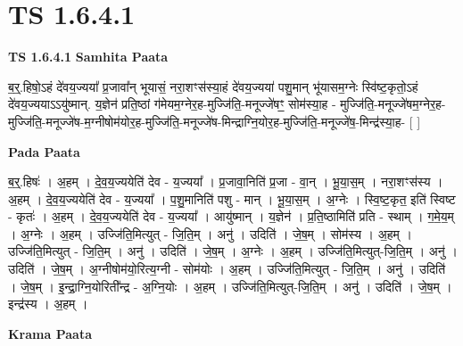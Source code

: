 \documentclass[17pt]{extarticle}
\begin{document}
\section*{ TS 1.6.4.1 }

\textbf{TS 1.6.4.1 } \newline
\textbf{Samhita Paata} \newline

ब॒र्॒.हिषो॒ऽहं दे॑वय॒ज्यया᳚ प्र॒जावा᳚न् भूयासं॒ नरा॒शꣳस॑स्या॒हं दे॑वय॒ज्यया॑ पशु॒मान् भू॑यासम॒ग्नेः स्वि॑ष्ट॒कृतो॒ऽहं दे॑वय॒ज्ययाऽऽयु॑ष्मान्. य॒ज्ञेन॑ प्रति॒ष्ठां ग॑मेयम॒ग्नेर॒ह-मुज्जि॑ति॒-मनूज्जे॑षꣳ॒॒ सोम॑स्या॒ह - मुज्जि॑ति॒-मनूज्जे॑षम॒ग्नेर॒ह-मुज्जि॑ति॒-मनूज्जे॑ष-म॒ग्नीषोम॑योर॒ह-मुज्जि॑ति॒-मनूज्जे॑ष-मिन्द्राग्नि॒योर॒ह-मुज्जि॑ति॒-मनूज्जे॑ष॒-मिन्द्र॑स्या॒ह- [ ] \newline

\textbf{Pada Paata} \newline

ब॒र्॒.हिषः॑ । अ॒हम् । दे॒व॒य॒ज्ययेति॑ देव - य॒ज्यया᳚ । प्र॒जावा॒निति॑ प्र॒जा - वा॒न् । भू॒या॒स॒म् । नरा॒शꣳस॑स्य । अ॒हम् । दे॒व॒य॒ज्ययेति॑ देव - य॒ज्यया᳚ । प॒शु॒मानिति॑ पशु - मान् । भू॒या॒स॒म् । अ॒ग्नेः । स्वि॒ष्ट॒कृत॒ इति॑ स्विष्ट - कृतः॑ । अ॒हम् । दे॒व॒य॒ज्ययेति॑ देव - य॒ज्यया᳚ । आयु॑ष्मान् । य॒ज्ञेन॑ । प्र॒ति॒ष्ठामिति॑ प्रति - स्थाम् । ग॒मे॒य॒म् । अ॒ग्नेः । अ॒हम् । उज्जि॑ति॒मित्युत् - जि॒ति॒म् । अनु॑ । उदिति॑ । जे॒ष॒म् । सोम॑स्य । अ॒हम् । उज्जि॑ति॒मित्युत् - जि॒ति॒म् । अनु॑ । उदिति॑ । जे॒ष॒म् । अ॒ग्नेः । अ॒हम् । उज्जि॑ति॒मित्युत्-जि॒ति॒म् । अनु॑ । उदिति॑ । जे॒ष॒म् । अ॒ग्नीषोम॑यो॒रित्य॒ग्नी - सोम॑योः । अ॒हम् । उज्जि॑ति॒मित्युत् - जि॒ति॒म् । अनु॑ । उदिति॑ । जे॒ष॒म् । इ॒न्द्रा॒ग्नि॒योरिती᳚न्द्र - अ॒ग्नि॒योः । अ॒हम् । उज्जि॑ति॒मित्युत्-जि॒ति॒म् । अनु॑ । उदिति॑ । जे॒ष॒म् । इन्द्र॑स्य । अ॒हम् ।  \newline


\textbf{Krama Paata} \newline
\end{document}
